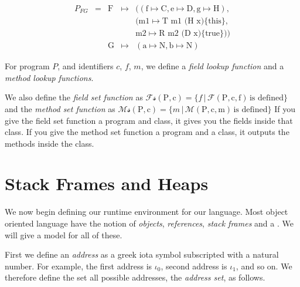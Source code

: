 \frmrule

\[ \begin{array}{lllll}
P_{FG} & = & \text{F}   & \mapsto & ((\text{f} \mapsto \text{C},
                                  \text{e} \mapsto \text{D}, 
                                  \text{g} \mapsto \text{H}), \\ 
    &   &            &         &  (\text{m1} \mapsto \text{T m1 (H x)}\{ \text{this} \}, \\
    &   &            &         &  \text{m2} \mapsto \text{R m2 (D x)}\{ \text{true} \})) \\
    &   & \text{G}   & \mapsto & (\text{a} \mapsto \text{N},
                                  \text{b} \mapsto \text{N})
\end{array}\] 

\frmrule

For program $P$, and identiﬁers $c$, $f$, $m$, we define 
a \textit{field lookup function} and a \textit{method lookup functions}.


We also define the \textit{field set function} as 
$\mathcal{Fs}(\text{P},\text{c}) = \{ f\, |\, 
\mathcal{F}(\text{P},\text{c}, \text{f})\, \text{is defined} \}$
and the \textit{method set function} as
$\mathcal{Ms}(\text{P},\text{c}) = \{ m\, |\, 
\mathcal{M}(\text{P},\text{c}, \text{m})\, \text{is defined} \}$
If you give the field set function a program and class, it gives 
you the fields inside that class. If you give the method set 
function a program and a class, it outputs the methods inside the class. 

\section{Stack Frames and Heaps}

We now begin defining our runtime environment for our language. 
Most object oriented language have the notion of \textit{objects}, 
\textit{references}, \textit{stack frames} and a . 
We will give a model for all of these.

First we define an \textit{address} as a greek 
iota symbol subscripted with a natural number. 
For example, the first address is $\iota_0$, second address is $\iota_1$, and so on.
We therefore define the set all possible addresses, the \textit{address set}, as follows.


